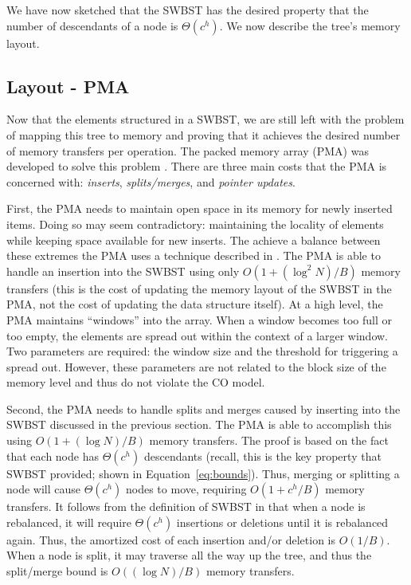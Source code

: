 \documentclass[preprint]{style}
\begin{document}
We have now sketched that the SWBST has the desired property that the number of
descendants of a node is $\Theta(c^h)$. We now describe the tree's memory layout.

\vspace{-0.1in}

\subsection{Layout - PMA}
\label{sec:layout}

Now that the elements structured in a SWBST, we are still left with the problem
of mapping this tree to memory and proving that it achieves the desired number
of memory transfers per operation. The packed memory array (PMA) was developed
to solve this problem \cite{BenderDemainColton}. There are three main costs
that the PMA is concerned with: \textit{inserts}, \textit{splits/merges}, and
\textit{pointer updates}.

First, the PMA needs to maintain open space in its memory for newly inserted
items. Doing so may seem contradictory: maintaining the locality of elements
while keeping space available for new inserts. The achieve a balance between
these extremes the PMA uses a technique
described in \cite{packedmemoryarray}.
The PMA is able to handle an insertion into the SWBST using only $O(1 +
(\log^2{N}) / B)$ memory transfers (this is the cost of updating the memory
layout of the SWBST in the PMA, not the cost of updating the data structure
itself). At a high level, the PMA maintains
``windows'' into the array. When a window becomes too full or too empty, the
elements are spread out within the context of a larger window. Two parameters
are required: the window size and the threshold for triggering a spread out.
However, these parameters are not related to the block size of the memory level
and thus do not violate the CO model. 

Second, the PMA needs to handle splits and merges caused by inserting into the
SWBST discussed in the previous section. The PMA is able to accomplish this
using $O(1 + (\log{N}) /B)$ memory transfers. The proof is based on the fact
that each node has $\Theta(c^h)$ descendants (recall, this is the key property
that SWBST provided; shown in Equation~\ref{eq:bounds}). Thus, merging or splitting a node will cause
$\Theta(c^h)$ nodes to move, requiring $O(1 + c^h/B)$ memory transfers. It
follows from the definition of SWBST in \cite{swbst} that when a node is
rebalanced, it will require $\Theta(c^h)$ insertions or deletions until it is
rebalanced again. Thus, the amortized cost of each insertion and/or deletion is
$O(1/B)$. When a node is split, it may traverse all the way up the tree, and
thus the split/merge bound is $O((\log N) / B)$ memory transfers.
\end{document}
